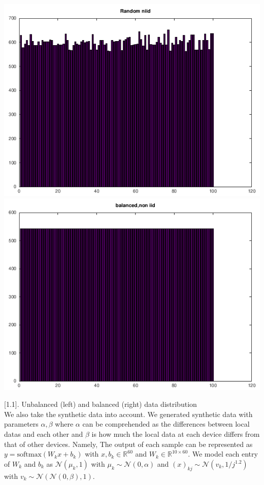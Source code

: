 \documentclass{article}
\theoremstyle{theorem}
\theoremstyle{definition}
\begin{document}
\begin{center}
		\includegraphics[scale=0.2]{random_niid.png}
		\includegraphics[scale=0.2]{equal.png}
\end{center}
		\figurename[1.1]{. Unbalanced (left) and balanced (right) data distribution}\\
We also take the synthetic data into account. We generated synthetic data with parameters $\alpha , \beta$ where $\alpha$ can be comprehended as the differences between local datas and each other and $\beta$ is how much the local data at each device differs from that of other devices. Namely, The output of each sample can be represented as $y=\text{softmax}(W_kx+b_k)$ with $x,b_k \in \mathbb{R}^{60}$ and $W_k \in \mathbb{R}^{10 \times 60}$. We model each entry of $W_k$ and $b_k$ as $\mathcal{N} (\mu_k,1)$ with $\mu_k \sim \mathcal{N}(0, \alpha)$ and $(x)_{kj} \sim  \mathcal{N}(v_k, 1/j^{1.2})$ with $v_k \sim \mathcal{N}(\mathcal{N}(0, \beta), 1)$.\\
\end{document}
